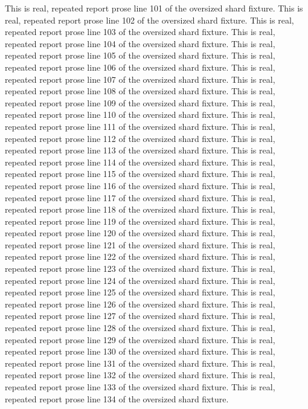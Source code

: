 This is real, repeated report prose line 101 of the oversized shard fixture.
This is real, repeated report prose line 102 of the oversized shard fixture.
This is real, repeated report prose line 103 of the oversized shard fixture.
This is real, repeated report prose line 104 of the oversized shard fixture.
This is real, repeated report prose line 105 of the oversized shard fixture.
This is real, repeated report prose line 106 of the oversized shard fixture.
This is real, repeated report prose line 107 of the oversized shard fixture.
This is real, repeated report prose line 108 of the oversized shard fixture.
This is real, repeated report prose line 109 of the oversized shard fixture.
This is real, repeated report prose line 110 of the oversized shard fixture.
This is real, repeated report prose line 111 of the oversized shard fixture.
This is real, repeated report prose line 112 of the oversized shard fixture.
This is real, repeated report prose line 113 of the oversized shard fixture.
This is real, repeated report prose line 114 of the oversized shard fixture.
This is real, repeated report prose line 115 of the oversized shard fixture.
This is real, repeated report prose line 116 of the oversized shard fixture.
This is real, repeated report prose line 117 of the oversized shard fixture.
This is real, repeated report prose line 118 of the oversized shard fixture.
This is real, repeated report prose line 119 of the oversized shard fixture.
This is real, repeated report prose line 120 of the oversized shard fixture.
This is real, repeated report prose line 121 of the oversized shard fixture.
This is real, repeated report prose line 122 of the oversized shard fixture.
This is real, repeated report prose line 123 of the oversized shard fixture.
This is real, repeated report prose line 124 of the oversized shard fixture.
This is real, repeated report prose line 125 of the oversized shard fixture.
This is real, repeated report prose line 126 of the oversized shard fixture.
This is real, repeated report prose line 127 of the oversized shard fixture.
This is real, repeated report prose line 128 of the oversized shard fixture.
This is real, repeated report prose line 129 of the oversized shard fixture.
This is real, repeated report prose line 130 of the oversized shard fixture.
This is real, repeated report prose line 131 of the oversized shard fixture.
This is real, repeated report prose line 132 of the oversized shard fixture.
This is real, repeated report prose line 133 of the oversized shard fixture.
This is real, repeated report prose line 134 of the oversized shard fixture.
